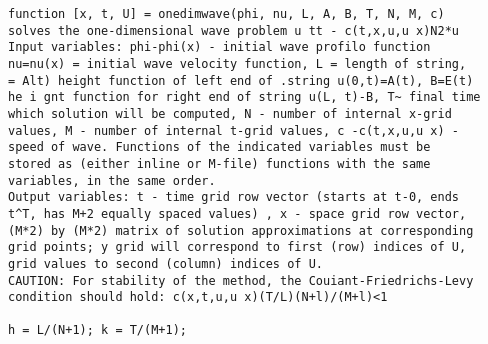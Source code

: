 \documentclass[../main.tex]{subfiles}
\begin{document}
\begin{lstlisting}
function [x, t, U] = onedimwave(phi, nu, L, A, B, T, N, M, c) 
solves the one-dimensional wave problem u tt - c(t,x,u,u x)N2*u 
Input variables: phi-phi(x) - initial wave profilo function 
nu=nu(x) = initial wave velocity function, L = length of string, 
= Alt) height function of left end of .string u(0,t)=A(t), B=E(t) 
he i gnt function for right end of string u(L, t)-B, T~ final time 
which solution will be computed, N - number of internal x-grid 
values, M - number of internal t-grid values, c -c(t,x,u,u x) -
speed of wave. Functions of the indicated variables must be 
stored as (either inline or M-file) functions with the same 
variables, in the same order. 
Output variables: t - time grid row vector (starts at t-0, ends 
t^T, has M+2 equally spaced values) , x - space grid row vector, 
(M*2) by (M*2) matrix of solution approximations at corresponding 
grid points; y grid will correspond to first (row) indices of U, 
grid values to second (column) indices of U. 
CAUTION: For stability of the method, the Couiant-Friedrichs-Levy 
condition should hold: c(x,t,u,u x)(T/L)(N+l)/(M+l)<1 

h = L/(N+1); k = T/(M+1); 
\end{lstlisting}
\end{document}
